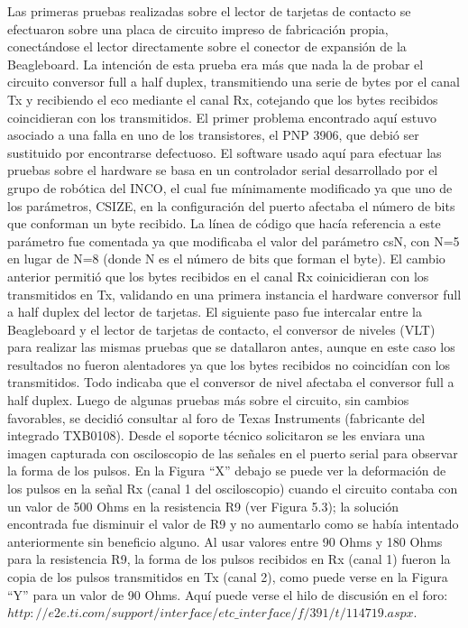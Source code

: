 Las primeras pruebas realizadas sobre el lector de tarjetas de contacto se efectuaron sobre una
placa de circuito impreso de fabricación propia, conectándose el lector directamente sobre el 
conector de expansión de la Beagleboard. La intención de esta prueba era más que nada la de probar
el circuito conversor full a half duplex, transmitiendo una serie de bytes por el canal Tx y recibiendo
el eco mediante el canal Rx, cotejando que los bytes recibidos coincidieran con los transmitidos. 
El primer problema encontrado aquí estuvo asociado a una falla en uno de los transistores, el PNP 3906, 
que debió ser sustituido por encontrarse defectuoso.
El software usado aquí para efectuar las pruebas sobre el hardware se basa en un controlador serial 
desarrollado por el grupo de robótica del INCO, el cual fue mínimamente modificado ya que uno de los 
parámetros, CSIZE, en la configuración del puerto afectaba el número de bits que conforman un byte recibido. 
La línea de código que hacía referencia a este parámetro fue comentada ya que modificaba el valor del parámetro 
csN, con N=5 en lugar de N=8 (donde N es el número de bits que forman el byte). 
El cambio anterior permitió que los bytes recibidos en el canal Rx coinicidieran con los transmitidos en Tx, 
validando en una primera instancia el hardware conversor full a half duplex del lector de tarjetas.
El siguiente paso fue intercalar entre la Beagleboard y el lector de tarjetas de contacto, el conversor de niveles (VLT) para realizar las mismas pruebas que se datallaron antes, aunque en este caso los resultados no fueron alentadores ya que los bytes recibidos no coincidían con los transmitidos. Todo indicaba que el conversor de nivel afectaba el conversor full a half duplex. Luego de algunas pruebas más sobre el circuito, sin cambios favorables, se decidió consultar al foro de Texas Instruments (fabricante del integrado TXB0108). Desde el soporte técnico solicitaron se les enviara una imagen capturada con osciloscopio de las señales en el puerto serial para observar la forma de los pulsos. En la Figura “X” debajo se puede ver la deformación de los pulsos en la señal Rx (canal 1 del osciloscopio) cuando el circuito contaba con un valor de 500 Ohms en la resistencia R9 (ver Figura 5.3); la solución encontrada fue disminuir el valor de R9 y no aumentarlo como se había intentado anteriormente sin beneficio alguno. Al usar valores entre 90 Ohms y 180 Ohms para la resistencia R9, la forma de los pulsos recibidos en Rx (canal 1) fueron la copia de los pulsos transmitidos en Tx (canal 2), como puede verse en la Figura “Y” para un valor de 90 Ohms. 
Aquí puede verse el hilo de discusión en el foro: ${http://e2e.ti.com/support/interface/etc\_interface/f/391/t/114719.aspx}$.


